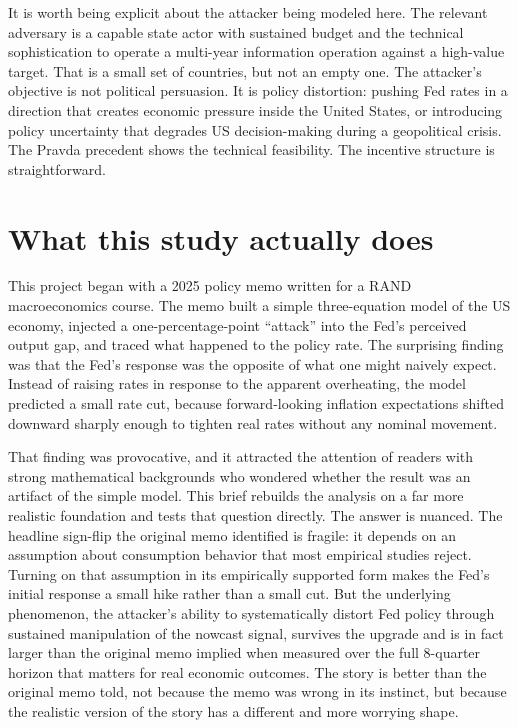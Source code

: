 \documentclass[12pt]{article}
\begin{document}
It is worth being explicit about the attacker being modeled here. The relevant adversary is a capable state actor with sustained budget and the technical sophistication to operate a multi-year information operation against a high-value target. That is a small set of countries, but not an empty one. The attacker's objective is not political persuasion. It is policy distortion: pushing Fed rates in a direction that creates economic pressure inside the United States, or introducing policy uncertainty that degrades US decision-making during a geopolitical crisis. The Pravda precedent shows the technical feasibility. The incentive structure is straightforward.

\section{What this study actually does}

This project began with a 2025 policy memo written for a RAND macroeconomics course. The memo built a simple three-equation model of the US economy, injected a one-percentage-point ``attack'' into the Fed's perceived output gap, and traced what happened to the policy rate. The surprising finding was that the Fed's response was the opposite of what one might naively expect. Instead of raising rates in response to the apparent overheating, the model predicted a small rate cut, because forward-looking inflation expectations shifted downward sharply enough to tighten real rates without any nominal movement.

That finding was provocative, and it attracted the attention of readers with strong mathematical backgrounds who wondered whether the result was an artifact of the simple model. This brief rebuilds the analysis on a far more realistic foundation and tests that question directly. The answer is nuanced. The headline sign-flip the original memo identified is fragile: it depends on an assumption about consumption behavior that most empirical studies reject. Turning on that assumption in its empirically supported form makes the Fed's initial response a small hike rather than a small cut. But the underlying phenomenon, the attacker's ability to systematically distort Fed policy through sustained manipulation of the nowcast signal, survives the upgrade and is in fact larger than the original memo implied when measured over the full 8-quarter horizon that matters for real economic outcomes. The story is better than the original memo told, not because the memo was wrong in its instinct, but because the realistic version of the story has a different and more worrying shape.
\end{document}
